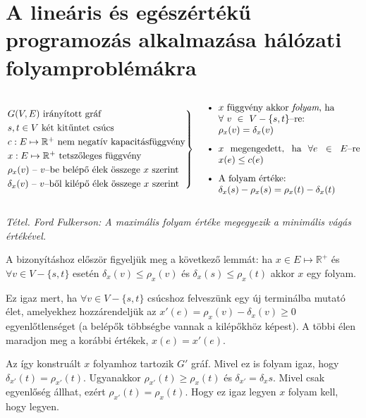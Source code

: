 \newpage
\section{A lineáris és egészértékű programozás alkalmazása hálózati folyamproblémákra}

\[
\begin{rcases} 
G(V,E) \mbox{ irányított gráf} \\
s,t \in V \mbox{ két kitűntet csúcs} \\
c : E \mapsto \mathbb{R}^+ \mbox{ nem negatív kapacitásfüggvény}\\
x : E \mapsto \mathbb{R}^+ \mbox{ tetszőleges függvény}\\
\rho_x(v) \mbox{ -- } v\mbox{--be belépő élek összege } x \mbox{ szerint} \\
\delta_x(v) \mbox{ -- } v\mbox{--ből kilépő élek összege } x \mbox{ szerint}
\end{rcases} \parbox[c]{6.2cm}{ 
\begin{itemize}
  \item $x$ függvény akkor \emph{folyam}, ha \\ $\forall~v~\in~V - \{s,t\}$--re: \\ $\rho_x(v)=\delta_x(v)$
  \item $x$ megengedett, ha $\forall e \in E$--re $x(e) \leq c(e)$
  \item A folyam értéke: \\ $\delta_x(s)-\rho_x(s)=\rho_x(t)-\delta_x(t)$
\end{itemize}
 }
\]

\emph{Tétel. Ford Fulkerson: A maximális folyam értéke megegyezik a minimális vágás értékével.}

A bizonyításhoz először figyeljük meg a következő lemmát: ha $x \in E \mapsto
\mathbb{R}^+$ és $\forall v \in V - \{s,t\}$ esetén $ \delta_x(v) \leq \rho_x(v)$
és $\delta_x(s) \leq \rho_x(t)$ akkor $x$ egy folyam. 

Ez igaz mert, ha $\forall v \in V-\{s,t\}$ csúcshoz felveszünk egy új terminálba
mutató élet, amelyekhez hozzárendeljük az $x'(e)=\rho_x(v)-\delta_x(v) \geq 0$
egyenlőtlenséget (a belépők többségbe vannak a kilépőkhöz képest). A többi élen
maradjon meg a korábbi értékek, $x(e)=x'(e)$. 

Az így konstruált $x$ folyamhoz tartozik $G'$ gráf.  Mivel ez is folyam igaz,
hogy $\delta_{x'}(t) = \rho_{x'}(t)$. Ugyanakkor $ \rho_{x'}(t) \geq \rho_x(t)$
és $\delta_{x'}=\delta_{x}s$. Mivel csak egyenlőség állhat, ezért
$\rho_{x'}(t)=\rho_{x}(t)$. Hogy ez igaz legyen $x$ folyam kell, hogy legyen.


